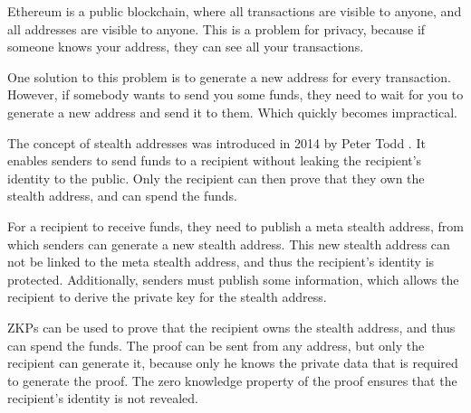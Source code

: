 Ethereum is a public blockchain, where all transactions are visible to anyone,
and all addresses are visible to anyone. This is a problem for privacy, because
if someone knows your address, they can see all your transactions.

One solution to this problem is to generate a new address for every transaction.
However, if somebody wants to send you some funds, they need to wait for you to
generate a new address and send it to them. Which quickly becomes impractical.

The concept of stealth addresses was introduced in 2014 by Peter Todd \cite{ToddStealthAddresses}.
It enables senders to send funds to a recipient without leaking the recipient's
identity to the public. Only the recipient can then prove that they own the stealth
address, and can spend the funds.

For a recipient to receive funds, they need to publish a meta stealth address,
from which senders can generate a new stealth address. This new stealth address
can not be linked to the meta stealth address, and thus the recipient's identity
is protected. Additionally, senders must publish some information, which allows
the recipient to derive the private key for the stealth address.

ZKPs can be used to prove that the recipient owns the stealth address, and
thus can spend the funds. The proof can be sent from any address, but only
the recipient can generate it, because only he knows the private data
that is required to generate the proof. The zero knowledge property of the
proof ensures that the recipient's identity is not revealed.


